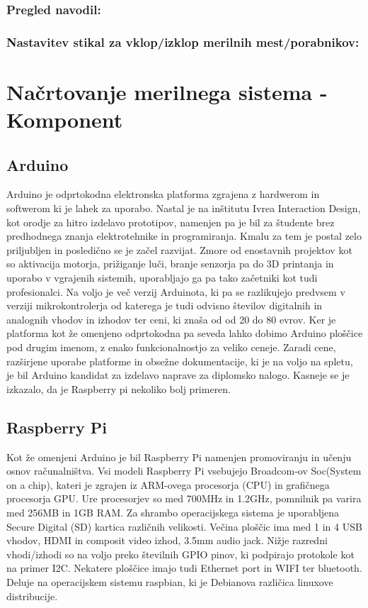 \documentclass[12pt,a4paper,titlepage,openany]{report}
\begin{document}
\subsection{Pregled navodil:}

\subsection{Nastavitev stikal za vklop/izklop merilnih mest/porabnikov:}

\chapter{Načrtovanje merilnega sistema - Komponent}
\thispagestyle{fancy}

\section{Arduino}
Arduino je odprtokodna elektronska platforma zgrajena z hardwerom in softwerom ki je lahek za uporabo. Nastal je na inštitutu Ivrea Interaction Design, kot orodje za hitro izdelavo prototipov, namenjen pa je bil za študente brez predhodnega znanja elektrotehnike in programiranja. Kmalu za tem je postal zelo priljubljen in posledično se je začel razvijat. Zmore od enostavnih projektov kot so aktivacija motorja, prižiganje luči, branje senzorja pa do 3D printanja in uporabo v vgrajenih sistemih, uporabljajo ga pa tako začetniki kot tudi profesionalci. Na voljo je več verzij Arduinota, ki pa se razlikujejo predvsem v verziji mikrokontrolerja od katerega je tudi odvisno številov digitalnih in analognih vhodov in izhodov ter ceni, ki znaša od od 20 do 80 evrov. Ker je platforma kot že omenjeno odprtokodna pa seveda lahko dobimo Arduino ploščice pod drugim imenom, z enako funkcionalnostjo za veliko ceneje. Zaradi cene, razširjene uporabe platforme in obsežne dokumentacije, ki je na voljo na spletu, je bil Arduino kandidat za izdelavo naprave za diplomsko nalogo. Kasneje se je izkazalo, da je Raspberry pi nekoliko bolj     primeren.

\section{Raspberry Pi}
Kot že omenjeni Arduino je bil Raspberry Pi namenjen promoviranju in učenju osnov računalništva. Vsi modeli Raspberry Pi vsebujejo Broadcom-ov Soc(System on a chip), kateri je zgrajen iz ARM-ovega procesorja (CPU) in grafičnega procesorja GPU. Ure procesorjev so med 700MHz in 1.2GHz, pomnilnik pa varira med 256MB in 1GB RAM. Za shrambo operacijskega sistema je uporabljena Secure Digital (SD) kartica različnih velikosti. Večina ploščic ima med 1 in 4 USB vhodov, HDMI in composit video izhod, 3.5mm audio jack. Nižje razredni vhodi/izhodi so na voljo preko številnih GPIO pinov, ki podpirajo protokole kot na primer I2C. Nekatere ploščice imajo tudi Ethernet port in WIFI ter bluetooth. Deluje na operacijskem sistemu raspbian, ki je Debianova različica linuxove distribucije.
\end{document}
